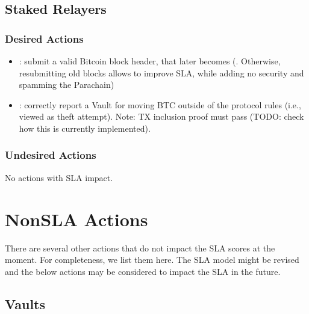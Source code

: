 \documentclass[a4paper,10pt,english]{sphinxmanual}
\begin{document}
\subsection{Staked Relayers}
\label{\detokenize{economics/SLA:staked-relayers}}

\subsubsection{Desired Actions}
\label{\detokenize{economics/SLA:id2}}\begin{itemize}
\item {} 
: submit a valid Bitcoin block header, that later becomes (. Otherwise, resubmitting old blocks allows to improve SLA, while adding no security and spamming the Parachain)

\item {} 
: correctly report a Vault for moving BTC outside of the protocol rules (i.e., viewed as theft attempt).
\sphinxhyphen{} Note: TX inclusion proof must pass (TODO: check how this is currently implemented).

\end{itemize}


\subsubsection{Undesired Actions}
\label{\detokenize{economics/SLA:id3}}
No actions with SLA impact.


\section{Non\sphinxhyphen{}SLA Actions}
\label{\detokenize{economics/SLA:non-sla-actions}}
There are several other actions that do not impact the SLA scores at the moment.
For completeness, we list them here. The SLA model might be revised and the below actions may be considered to impact the SLA in the future.


\subsection{Vaults}
\label{\detokenize{economics/SLA:id4}}
\end{document}
